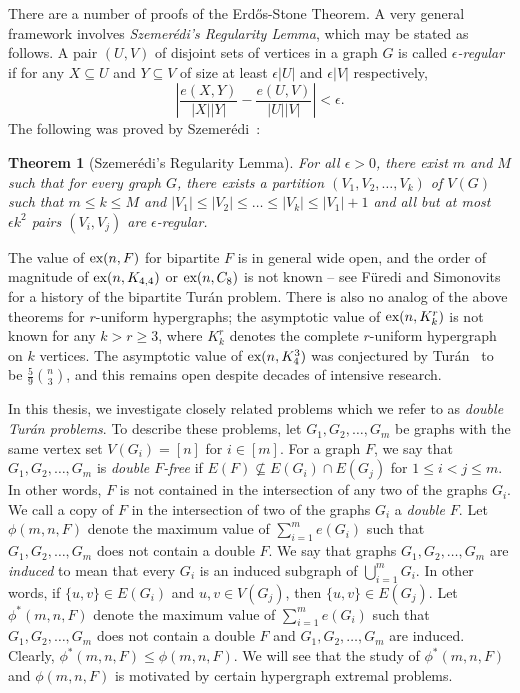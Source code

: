 \documentclass[12pt]{article}
\newcounter{foo}
\newtheorem{oldtheorem}[foo]{Theorem}
\newcommand*{\ex}{\textnormal{ex}}
\begin{document}
There are a number of proofs of the Erd\H{o}s-Stone Theorem. A very general framework involves \textit{Szemer\'{e}di's Regularity Lemma}, which may be stated as follows. A pair $(U,V)$ of disjoint sets of vertices in a graph $G$ is called \textit{$\epsilon$-regular} if for any $X \subseteq U$ and $Y \subseteq V$ of size at least $\epsilon |U|$ and $\epsilon|V|$ respectively, 
\[
  \left|\frac{e(X, Y)}{|X||Y|} - \frac{e(U, V)}{|U||V|}\right| < \epsilon.
\]
The following was proved by Szemer\'{e}di~\cite{Szemeredi1978}:

\begin{oldtheorem} [Szemer\'{e}di's Regularity Lemma]
For all $\epsilon > 0$, there exist $m$ and $M$ such that for every graph $G$, there exists a partition $(V_1, V_2, \dots, V_k)$ of $V(G)$ such that $m \leq k \leq M$ and $|V_1| \leq |V_2| \leq \dots \leq |V_k| \leq |V_1| + 1$ and all but at most $\epsilon k^2$ pairs $(V_i, V_j)$ are $\epsilon$-regular. 
\end{oldtheorem}

The value of $\ex(n, F)$ for bipartite $F$ is in general wide open, and the order of magnitude of $\ex(n, K_{4, 4})$ or $\ex(n, C_8)$ is not known -- see F\"{u}redi and Simonovits~\cite{FurediSimonovits2013} for a history of the bipartite Tur\'{a}n problem. There is also no analog of the above theorems for $r$-uniform hypergraphs; the asymptotic value of $\ex(n, K_k^r)$ is not known for any $k > r \geq 3$, where $K_k^r$ denotes the complete $r$-uniform hypergraph on $k$ vertices. The asymptotic value of $\ex(n, K_4^3)$ was conjectured by Tur\'{a}n~\cite{Turan1941} to be $\frac{5}{9} \binom{n}{3}$, and this remains open despite decades of intensive research. 

In this thesis, we investigate closely related problems which we refer to as \textit{double Tur\'{a}n problems}. To describe these problems, let $G_1, G_2, \ldots, G_m$ be graphs with the same vertex set $V(G_i) = [n]$ for $i \in [m]$. For a graph $F$, we say that $G_1, G_2, \dots, G_m$ is \textit{double $F$-free} if $E(F) \not \subseteq E(G_i) \cap E(G_j)$ for $1 \leq i < j \leq m$. In other words, $F$ is not contained in the intersection of any two of the graphs $G_i$. We call a copy of $F$ in the intersection of two of the graphs $G_i$ a \textit{double $F$}. Let $\phi(m, n, F)$ denote the maximum value of $\sum_{i = 1}^m e(G_i)$ such that $G_1, G_2, \dots, G_m$ does not contain a double $F$. We say that graphs $G_1, G_2, \dots, G_m$ are \textit{induced} to mean that every $G_i$ is an induced subgraph of $\bigcup_{i = 1}^m G_i$. In other words, if $\{u,v\} \in E(G_i)$ and $u,v \in V(G_j)$, then $\{u,v\} \in E(G_j)$. Let $\phi^*(m, n, F)$ denote the maximum value of $\sum_{i = 1}^m e(G_i)$ such that $G_1, G_2, \dots, G_m$ does not contain a double $F$ and $G_1, G_2,\dots, G_m$ are induced. Clearly, $\phi^*(m, n, F) \leq \phi(m, n, F)$. We will see that the study of $\phi^*(m, n, F)$ and $\phi(m, n,F )$ is motivated by certain hypergraph extremal problems.
\end{document}

